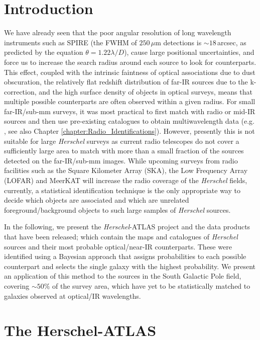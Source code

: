 \sloppy

\section{Introduction}

We have already seen that the poor angular resolution of long wavelength instruments such as SPIRE (the FWHM of $250\,\mu$m detections is $\sim18\,$arcsec, as predicted by the equation $\theta = 1.22\lambda/D$), cause large positional uncertainties, and force us to increase the search radius around each source to look for counterparts. This effect, coupled with the intrinsic faintness of optical associations due to dust obscuration, the relatively flat redshift distribution of far-IR sources due to the k-correction, and the high surface density of objects in optical surveys, means that multiple possible counterparts are often observed within a given radius. For small far-IR/sub-mm surveys, it was most practical to first match with radio or mid-IR sources and then use pre-existing catalogues to obtain multiwavelength data (e.g. \citealt{Ivison_2007, Dye_2009, Biggs_2011}, see also Chapter \ref{chapter:Radio_Identifications}). However, presently this is not suitable for large \textit{Herschel} surveys as current radio telescopes do not cover a sufficiently large area to match with more than a small fraction of the sources detected on the far-IR/sub-mm images. While upcoming surveys from radio facilities such as the Square Kilometer Array (SKA), the Low Frequency Array (LOFAR) and MeerKAT will increase the radio coverage of the \textit{Herschel} fields, currently, a statistical identification technique is the only appropriate way to decide which objects are associated and which are unrelated foreground/background objects to such large samples of \textit{Herschel} sources.

In the following, we present the \textit{Herschel}-ATLAS project and the data products that have been released; which contain the maps and catalogues of \textit{Herschel} sources and their most probable optical/near-IR counterparts. These were identified using a Bayesian approach that assigns probabilities to each possible counterpart and selects the single galaxy with the highest probability. We present an application of this method to the sources in the South Galactic Pole field, covering $\sim50\%$ of the survey area, which have yet to be statistically matched to galaxies observed at optical/IR wavelengths.

\section{The Herschel-ATLAS}
\label{sec:The Herschel-ATLAS}


